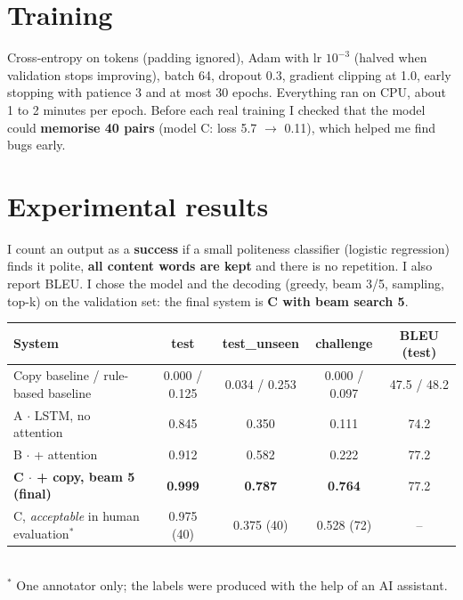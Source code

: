 \documentclass[10pt,a4paper]{article}
\begin{document}
\section{Training}
Cross-entropy on tokens (padding ignored), Adam with lr $10^{-3}$ (halved when validation stops
improving), batch 64, dropout 0.3, gradient clipping at 1.0, early stopping with patience 3 and at
most 30 epochs. Everything ran on CPU, about 1 to 2 minutes per epoch. Before each real training I
checked that the model could \textbf{memorise 40 pairs} (model C: loss 5.7 $\rightarrow$ 0.11), which
helped me find bugs early.

\section{Experimental results}
I count an output as a \textbf{success} if a small politeness classifier (logistic regression) finds
it polite, \textbf{all content words are kept} and there is no repetition. I also report BLEU. I chose
the model and the decoding (greedy, beam 3/5, sampling, top-k) on the validation set: the final system
is \textbf{C with beam search 5}.

\noindent\begin{minipage}{\linewidth}
\centering\small
\begin{tabularx}{\linewidth}{@{}Xcccc@{}}
\toprule
System & test & test\_unseen & challenge & BLEU (test) \\
\midrule
Copy baseline / rule-based baseline & 0.000 / 0.125 & 0.034 / 0.253 & 0.000 / 0.097 & 47.5 / 48.2 \\
A $\cdot$ LSTM, no attention & 0.845 & 0.350 & 0.111 & 74.2 \\
B $\cdot$ + attention & 0.912 & 0.582 & 0.222 & 77.2 \\
\textbf{C $\cdot$ + copy, beam 5 (final)} & \textbf{0.999} & \textbf{0.787} & \textbf{0.764} & 77.2 \\
C, \emph{acceptable} in human evaluation$^{*}$ & 0.975 (40) & 0.375 (40) & 0.528 (72) & -- \\
\bottomrule
\end{tabularx}\\[2pt]
{\footnotesize $^{*}$ One annotator only; the labels were produced with the help of an AI assistant.}
\end{minipage}\vspace{4pt}
\end{document}
